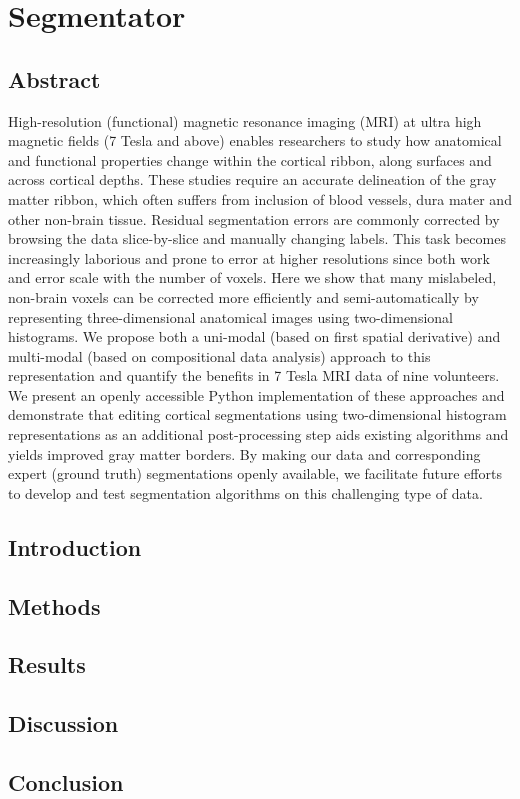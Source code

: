\chapter{Segmentator}

\section{Abstract}
High-resolution (functional) magnetic resonance imaging (MRI) at ultra high magnetic fields (7 Tesla and above) enables researchers to study how anatomical and functional properties change within the cortical ribbon, along surfaces and across cortical depths. These studies require an accurate delineation of the gray matter ribbon, which often suffers from inclusion of blood vessels, dura mater and other non-brain tissue. Residual segmentation errors are commonly corrected by browsing the data slice-by-slice and manually changing labels. This task becomes increasingly laborious and prone to error at higher resolutions since both work and error scale with the number of voxels. Here we show that many mislabeled, non-brain voxels can be corrected more efficiently and semi-automatically by representing three-dimensional anatomical images using two-dimensional histograms. We propose both a uni-modal (based on first spatial derivative) and multi-modal (based on compositional data analysis) approach to this representation and quantify the benefits in 7 Tesla MRI data of nine volunteers. We present an openly accessible Python implementation of these approaches and demonstrate that editing cortical segmentations using two-dimensional histogram representations as an additional post-processing step aids existing algorithms and yields improved gray matter borders. By making our data and corresponding expert (ground truth) segmentations openly available, we facilitate future efforts to develop and test segmentation algorithms on this challenging type of data.


\section{Introduction}
\lipsum[1-1] 

\section{Methods}
\lipsum[1-2]
\cite{Lakatos1970}

\section{Results}
\lipsum[1-3]

\section{Discussion}
\lipsum[1-4]

\section{Conclusion}
\lipsum[1-5]

\clearpage
\printbibliography[heading=subbibliography]